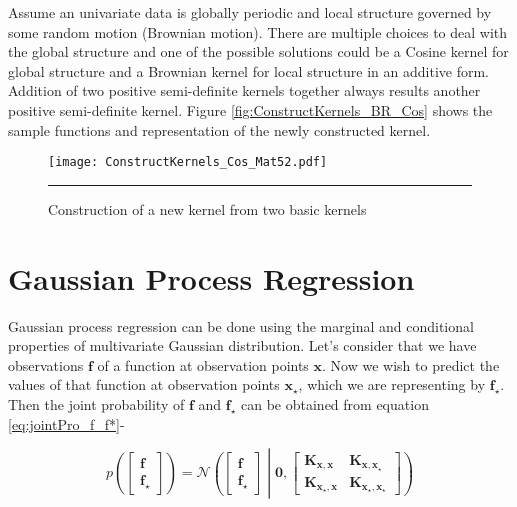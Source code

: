 Assume an univariate data is globally periodic and local structure governed by some random motion (Brownian motion). There are multiple choices to deal with the global structure and one of the possible solutions could be a Cosine kernel for global structure and a Brownian kernel for local structure in an additive form. Addition of two positive semi-definite kernels together always results another positive semi-definite kernel. Figure \ref{fig:ConstructKernels_BR_Cos} shows the sample functions and representation of the newly constructed kernel.

\begin{figure}[t]
	\centering
		\texttt{[image: ConstructKernels\_Cos\_Mat52.pdf]}
		\rule{35em}{0.5pt}
	\caption[Construction of a new kernel from two basic kernels]
		{Construction of a new kernel from two basic kernels} %
	\label{fig:ConstructKernels}
\end{figure}

\section{Gaussian Process Regression}
Gaussian process regression can be done using the marginal and conditional properties of multivariate Gaussian distribution. Let's consider that we have observations $\mathbf{f}$ of a function at observation points $\mathbf{x}$. Now we wish to predict the values of that function at observation points $\mathbf{x_\star}$, which we are representing by $\mathbf{f_\star}$. Then the joint probability of $\mathbf{f}$ and $\mathbf{f_\star}$ can be obtained from equation \ref{eq:jointPro_f_f*}-

\begin{equation} \label{eq:jointPro_f_f*}
p \left( \begin{bmatrix} \mathbf{f} \\\mathbf{f_\star} \end{bmatrix} \right) =
\mathcal{N}\left( \begin{bmatrix} \mathbf{f} \\\mathbf{f_\star} \end{bmatrix} \middle|
\mathbf{0}, \begin{bmatrix} \mathbf{K_{x,x}} & \mathbf{K_{x,x_\star}} \\
			    \mathbf{K_{x_\star,x}} & \mathbf{K_{x_\star,x_\star}} \end{bmatrix} \right)
\end{equation}

